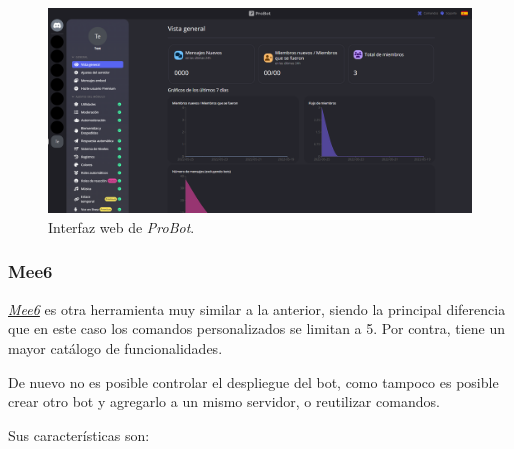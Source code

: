 \begin{figure}[H]
	\centering
	\includegraphics[width=1\textwidth]{img/probot.png}
	\caption{Interfaz web de \textit{ProBot}.}
\end{figure}

\subsubsection{Mee6}

\href{https://mee6.xyz/}{\textit{Mee6}} es otra herramienta muy similar a la anterior, siendo la principal diferencia que en este caso los comandos personalizados se limitan a 5. Por contra, tiene un mayor catálogo de funcionalidades.

De nuevo no es posible controlar el despliegue del bot, como tampoco es posible crear otro bot y agregarlo a un mismo servidor, o reutilizar comandos.

Sus características son:

